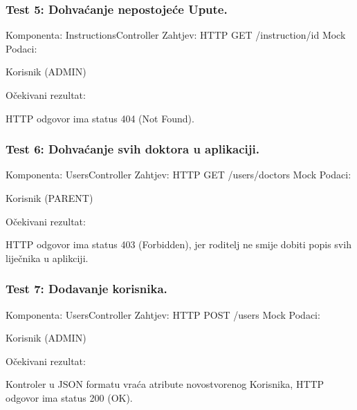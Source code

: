 			\subsubsection*{Test 5: Dohvaćanje nepostojeće Upute.}
			Komponenta: InstructionsController \newline
			Zahtjev: HTTP GET /instruction/{id} \newline
			Mock Podaci:
			\begin{packed_item}
				\item Korisnik (ADMIN)
			\end{packed_item}
			Očekivani rezultat:
			\begin{packed_item}
				\item HTTP odgovor ima status 404 (Not Found).
			\end{packed_item}

			\subsubsection*{Test 6: Dohvaćanje svih doktora u aplikaciji.}
			Komponenta: UsersController \newline
			Zahtjev: HTTP GET /users/doctors \newline
			Mock Podaci:
			\begin{packed_item}
				\item Korisnik (PARENT)
			\end{packed_item}
			Očekivani rezultat:
			\begin{packed_item}
				\item HTTP odgovor ima status 403 (Forbidden), jer roditelj ne smije dobiti popis svih liječnika u aplikciji.
			\end{packed_item}
			
			\subsubsection*{Test 7: Dodavanje korisnika.}
			Komponenta: UsersController \newline
			Zahtjev: HTTP POST /users \newline
			Mock Podaci:
			\begin{packed_item}
				\item Korisnik (ADMIN)
			\end{packed_item}
			Očekivani rezultat:
			\begin{packed_item}
				\item Kontroler u JSON formatu vraća atribute novostvorenog Korisnika, HTTP odgovor ima status 200 (OK).
			\end{packed_item}
			
